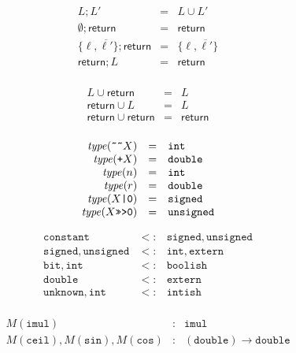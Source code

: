 \documentclass{article}
\newcommand{\type}{\mathit{type}}
\newcommand{\funty}[2]{({#1}) \rightarrow {#2}}
\newcommand{\seq}[1]{\overline{{#1}}}
\newcommand{\mathjs}[1]{\mbox{\texttt{{#1}}}}
\newcommand{\bit}{\mathtt{bit}}
\newcommand{\unsigned}{\mathtt{unsigned}}
\newcommand{\signed}{\mathtt{signed}}
\newcommand{\constant}{\mathtt{constant}}
\newcommand{\double}{\mathtt{double}}
\newcommand{\extern}{\mathtt{extern}}
\newcommand{\unk}{\mathtt{unknown}}
\newcommand{\mustret}{\mathsf{return}}
\newcommand{\seqcomp}{\mathrel{;}}
\newcommand{\toint}[1]{\mathjs{\~{}\~{}}{#1}}
\newcommand{\todouble}[1]{\mathjs{+}{#1}}
\renewcommand{\int}{\mathtt{int}}
\newcommand{\boolish}{\mathtt{boolish}}
\newcommand{\imul}{\mathtt{imul}}
\newcommand{\intish}{\mathtt{intish}}
\begin{document}
\[
\begin{array}{rcl}
L                       \seqcomp L'       & = & L \cup L' \\
\emptyset               \seqcomp \mustret & = & \mustret \\
\{ \ell, \seq{\ell'} \} \seqcomp \mustret & = & \{ \ell, \seq{\ell'} \} \\
\mustret                \seqcomp L        & = & \mustret \\
\end{array}
\]

\[
\begin{array}{rcl}
L        \cup \mustret & = & L \\
\mustret \cup L        & = & L \\
\mustret \cup \mustret & = & \mustret \\
\end{array}
\]

\[
\begin{array}{rcl}
\type(\toint{X})      & = & \int \\
\type(\todouble{X})   & = & \double \\
\type(n)              & = & \int \\
\type(r)              & = & \double \\
\type(X\mathjs{|0})   & = & \signed \\
\type(X\mathjs{>>>0}) & = & \unsigned \\
\end{array}
\]


\[
\begin{array}{rcl}
\constant                                                                           & <: & \signed, \unsigned \\
\signed, \unsigned                                                                  & <: & \int, \extern \\
\bit, \int                                                                          & <: & \boolish \\
\double                                                                             & <: & \extern \\
\unk, \int                                                                          & <: & \intish \\
\end{array}
\]

\[
\begin{array}{rcl}
M(\imul) & : & \imul \\
M(\mathtt{ceil}), M(\mathtt{sin}), M(\mathtt{cos}) & : & \funty{\double}{\double} \\
\end{array}
\]
\end{document}
